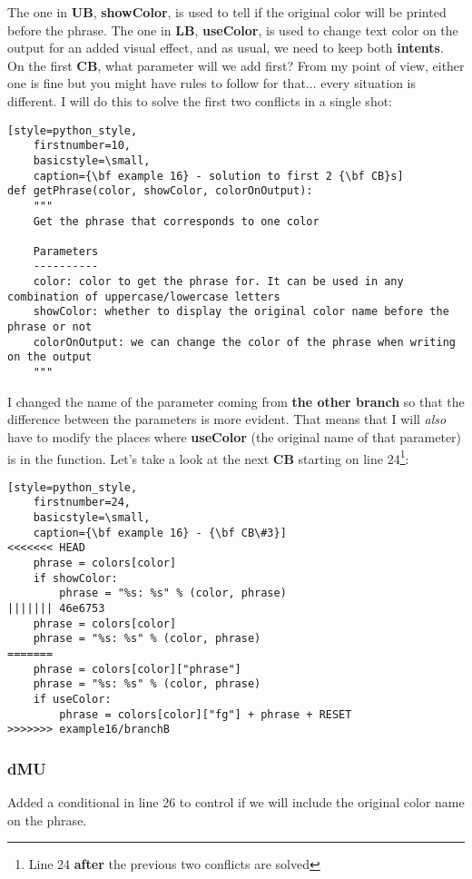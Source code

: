 The one in {\bf UB}, {\bf showColor}, is used to tell if the original color will be printed before the phrase. The one in {\bf LB},
{\bf useColor}, is used to change text color on the output for an added visual effect, and as usual, we need to keep both {\bf intents}.
On the first {\bf CB}, what parameter will we add first? From my point of view, either one is fine but you might have rules to follow
for that... every situation is different. I will do this to solve the first two conflicts in a single shot:

\begin{lstlisting}[style=python_style,
	firstnumber=10,
	basicstyle=\small,
	caption={\bf example 16} - solution to first 2 {\bf CB}s]
def getPhrase(color, showColor, colorOnOutput):
    """
    Get the phrase that corresponds to one color
    
    Parameters
    ----------
    color: color to get the phrase for. It can be used in any combination of uppercase/lowercase letters
    showColor: whether to display the original color name before the phrase or not
    colorOnOutput: we can change the color of the phrase when writing on the output
    """
\end{lstlisting}

I changed the name of the parameter coming from {\bf the other branch} so that the difference between the parameters is more
evident. That means that I will {\it also} have to modify the places where {\bf useColor} (the original name of that parameter) is in
the function. Let's take a look at the next {\bf CB} starting on line 24\footnote{Line 24 {\bf after} the previous two conflicts are solved}:

\begin{lstlisting}[style=python_style,
	firstnumber=24,
	basicstyle=\small,
	caption={\bf example 16} - {\bf CB\#3}]
<<<<<<< HEAD
    phrase = colors[color]
    if showColor:
        phrase = "%s: %s" % (color, phrase)
||||||| 46e6753
    phrase = colors[color]
    phrase = "%s: %s" % (color, phrase)
=======
    phrase = colors[color]["phrase"]
    phrase = "%s: %s" % (color, phrase)
    if useColor:
        phrase = colors[color]["fg"] + phrase + RESET
>>>>>>> example16/branchB
\end{lstlisting}

\subsubsection{dMU}
Added a conditional in line 26 to control if we will include the original color name on the phrase.

